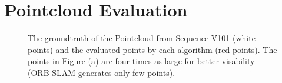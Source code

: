	
	


\section{Pointcloud Evaluation}

	\begin{figure}%
    \centering
    \qquad
	\qquad
    \caption{The groundtruth of the Pointcloud from Sequence V101 (white points) and the evaluated points by each algorithm (red points). 
	The points in Figure (a) are four times as large for better visability (ORB-SLAM generates only few points). 
	}%
    \label{fig:pointcloud}%
	\end{figure}
	
